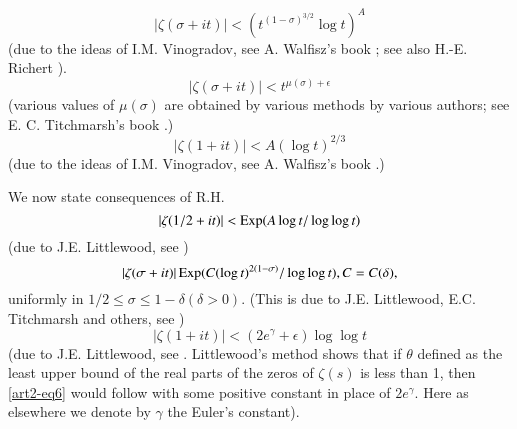 \begin{equation}
|\zeta(\sigma + it)| < (t^{(1-\sigma)^{3/2}} \log t)^A \label{art2-eq2}
\end{equation}\pageoriginale
(due to the ideas of I.M. Vinogradov, see A. Walfisz's book \cite{art2-key20}; see also H.-E. Richert \cite{art2-key18}).
\begin{equation*}
|\zeta(\sigma + it)| < t^{\mu(\sigma) +\epsilon}
\tag{2$'$}\label{art2-eq2'}
\end{equation*}
(various values of $\mu(\sigma)$ are obtained by various methods by various authors; see E. C. Titchmarsh's book \cite{art2-key19}.)
\begin{equation}
|\zeta(1+it)| < A( \log t)^{2/3} \label{art2-eq3}
\end{equation}
(due to the ideas of I.M. Vinogradov, see A. Walfisz's book \cite{art2-key20}.)

We now state consequences of R.H.
\begin{equation}
|\zeta(1/2 + it)| < \operatorname{Exp} (A \log t /\log\log t) \label{art2-eq4}
\end{equation}
(due to J.E. Littlewood, see \cite{art2-key19})
\begin{equation}
|\zeta (\sigma + it)| \operatorname{Exp} (C (\log t)^{2(1-\sigma)}/ \log \log t),C = C (\delta),
\label{art2-eq5}
\end{equation}
uniformly in $1/2 \leqslant \sigma \leqslant 1 -\delta (\delta > 0)$. (This is due to J.E. Littlewood, E.C. Titchmarsh and others, see \cite{art1-key19})
\begin{equation}
|\zeta(1+it)| < (2e^\gamma+ \epsilon) \log \log t
\end{equation}
(due to J.E. Littlewood, see \cite{art2-key19}. Littlewood's method shows that if $\theta$ defined as the least upper bound of the real parts of the zeros of $\zeta(s)$ is less than 1, then \eqref{art2-eq6} would follow with some positive constant in place of $2e^\gamma$. Here as elsewhere we denote by $\gamma$ the Euler's constant).


